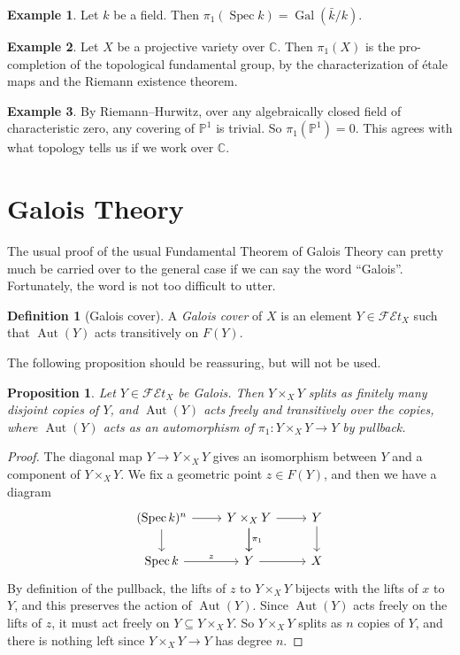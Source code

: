\documentclass{shortart}
\newtheorem*{prop}{Proposition}
\theoremstyle{definition}
\newtheorem*{defi}{Definition}
\newtheorem*{eg}{Example}
\renewcommand\P{\mathbb{P}}
\newcommand\C{\mathbb{C}}
\newcommand\FEt[1]{\mathscr{FE}t_{#1}}
\DeclareMathOperator\Gal{Gal}
\DeclareMathOperator\Spec{Spec}
\DeclareMathOperator\Aut{Aut}
\begin{document}
\begin{eg}
  Let $k$ be a field. Then $\pi_1(\Spec k) = \Gal(\bar{k}/k)$.
\end{eg}

\begin{eg}
  Let $X$ be a projective variety over $\C$. Then $\pi_1(X)$ is the pro-completion of the topological fundamental group, by the characterization of \'etale maps and the Riemann existence theorem.
\end{eg}

\begin{eg}
  By Riemann--Hurwitz, over any algebraically closed field of characteristic zero, any covering of $\P^1$ is trivial. So $\pi_1(\P^1) = 0$. This agrees with what topology tells us if we work over $\C$.
\end{eg}

\section{Galois Theory}
The usual proof of the usual Fundamental Theorem of Galois Theory can pretty much be carried over to the general case if we can say the word ``Galois''. Fortunately, the word is not too difficult to utter.

\begin{defi}[Galois cover]
  A \emph{Galois cover} of $X$ is an element $Y \in \FEt{X}$ such that $\Aut(Y)$ acts transitively on $F(Y)$.
\end{defi}
The following proposition should be reassuring, but will not be used.
\begin{prop}
  Let $Y \in \FEt{X}$ be Galois. Then $Y \times_X Y$ splits as finitely many disjoint copies of $Y$, and $\Aut(Y)$ acts freely and transitively over the copies, where $\Aut(Y)$ acts as an automorphism of $\pi_1: Y \times_X Y \to Y$ by pullback.
\end{prop}

\begin{proof}
  The diagonal map $Y \to Y \times_X Y$ gives an isomorphism between $Y$ and a component of $Y \times_X Y$. We fix a geometric point $z \in F(Y)$, and then we have a diagram
  \[
    \begin{tikzcd}
      (\Spec k)^n \ar[d] \ar[r] & Y \times_X Y \ar[d, "\pi_1"] \ar[r] \ar[d] & Y \ar[d]\\
      \Spec k \ar[r, "z"] & Y \ar[r] & X
    \end{tikzcd}
  \]
  By definition of the pullback, the lifts of $z$ to $Y \times_X Y$ bijects with the lifts of $x$ to $Y$, and this preserves the action of $\Aut(Y)$. Since $\Aut(Y)$ acts freely on the lifts of $z$, it must act freely on $Y \subseteq Y \times_X Y$. So $Y \times_X Y$ splits as $n$ copies of $Y$, and there is nothing left since $Y \times_X Y \to Y$ has degree $n$.
\end{proof}
\end{document}
